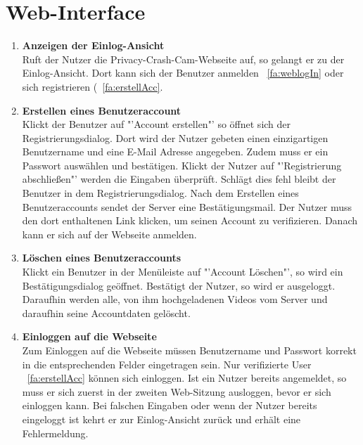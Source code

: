 \section{Web-Interface}
\begin{enumerate}
\renewcommand{\labelenumi}{\textbf{\theenumi}}
\renewcommand{\theenumi}{FA\arabic{enumi}0}
\setcounter{enumi}{299}
\item \textbf{Anzeigen der Einlog-Ansicht} \hfill \\
Ruft der Nutzer die Privacy-Crash-Cam-Webseite auf, so gelangt er zu der Einlog-Ansicht. Dort kann sich der Benutzer anmelden ~\eqref{fa:weblogIn} oder sich registrieren (~\eqref{fa:erstellAcc}.

\item \label{fa:erstellAcc}\textbf{Erstellen eines Benutzeraccount} \hfill \\
Klickt der Benutzer auf "'Account erstellen"' so öffnet sich der Registrierungsdialog. Dort wird der Nutzer gebeten einen einzigartigen Benutzername und eine E-Mail Adresse angegeben. Zudem muss er ein Passwort auswählen und bestätigen. Klickt der Nutzer auf "'Registrierung abschließen"' werden die Eingaben überprüft. Schlägt dies fehl bleibt der Benutzer in dem Registrierungsdialog. Nach dem Erstellen eines Benutzeraccounts sendet der Server eine Bestätigungsmail. Der Nutzer muss den dort enthaltenen Link klicken, um seinen Account zu verifizieren. Danach kann er sich auf der Webseite anmelden.

\item \label{fa:löschAcc}\textbf{Löschen eines Benutzeraccounts} \hfill \\
Klickt ein Benutzer in der Menüleiste auf "'Account Löschen"', so wird ein Bestätigungsdialog geöffnet. Bestätigt der Nutzer, so wird er ausgeloggt. Daraufhin werden alle, von ihm hochgeladenen Videos vom Server und daraufhin seine Accountdaten gelöscht.

\item \label{fa:weblogIn}\textbf{Einloggen auf die Webseite} \hfill \\
Zum Einloggen auf die Webseite müssen Benutzername und Passwort korrekt in die entsprechenden Felder eingetragen sein. Nur verifizierte User ~\eqref{fa:erstellAcc} können sich einloggen. Ist ein Nutzer bereits angemeldet, so muss er sich zuerst in der zweiten Web-Sitzung ausloggen, bevor er sich einloggen kann. Bei falschen Eingaben oder wenn der Nutzer bereits eingeloggt ist kehrt er zur Einlog-Ansicht zurück und erhält eine Fehlermeldung.


\end{enumerate}
